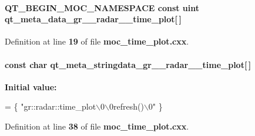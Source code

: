 \paragraph[{qt\+\_\+meta\+\_\+data\+\_\+gr\+\_\+\+\_\+radar\+\_\+\+\_\+time\+\_\+plot}]{\setlength{\rightskip}{0pt plus 5cm}Q\+T\+\_\+\+B\+E\+G\+I\+N\+\_\+\+M\+O\+C\+\_\+\+N\+A\+M\+E\+S\+P\+A\+CE const uint qt\+\_\+meta\+\_\+data\+\_\+gr\+\_\+\+\_\+radar\+\_\+\+\_\+time\+\_\+plot[$\,$]\hspace{0.3cm}{\ttfamily [static]}}\label{moc__time__plot_8cxx_ae78c0d43e55c60ba3185c54c25dd49b3}


Definition at line {\bf 19} of file {\bf moc\+\_\+time\+\_\+plot.\+cxx}.

\paragraph[{qt\+\_\+meta\+\_\+stringdata\+\_\+gr\+\_\+\+\_\+radar\+\_\+\+\_\+time\+\_\+plot}]{\setlength{\rightskip}{0pt plus 5cm}const char qt\+\_\+meta\+\_\+stringdata\+\_\+gr\+\_\+\+\_\+radar\+\_\+\+\_\+time\+\_\+plot[$\,$]\hspace{0.3cm}{\ttfamily [static]}}\label{moc__time__plot_8cxx_ad95d72303bd70a4d5cf44801a807f5b5}
{\bfseries Initial value\+:}
\begin{DoxyCode}
= \{
    \textcolor{stringliteral}{"gr::radar::time\_plot\(\backslash\)0\(\backslash\)0refresh()\(\backslash\)0"}
\}
\end{DoxyCode}


Definition at line {\bf 38} of file {\bf moc\+\_\+time\+\_\+plot.\+cxx}.

